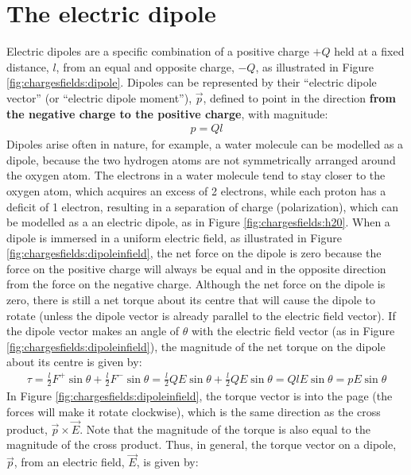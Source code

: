 \section{The electric dipole}
Electric dipoles are a specific combination of a positive charge $+Q$ held at a fixed distance, $l$, from an equal and opposite charge, $-Q$, as illustrated in Figure \ref{fig:chargesfields:dipole}. Dipoles can be represented by their ``electric dipole vector'' (or ``electric dipole moment''), $\vec p$, defined to point in the direction \textbf{from the negative charge to the positive charge}, with magnitude:
\begin{align*}
p=Ql
\end{align*}
Dipoles arise often in nature, for example, a water molecule can be modelled as a dipole, because the two hydrogen atoms are not symmetrically arranged around the oxygen atom. The electrons in a water molecule tend to stay closer to the oxygen atom, which acquires an excess of 2 electrons, while each proton has a deficit of 1 electron, resulting in a separation of charge (polarization), which can be modelled as a an electric dipole, as in Figure \ref{fig:chargesfields:h20}.
When a dipole is immersed in a uniform electric field, as illustrated in Figure \ref{fig:chargesfields:dipoleinfield}, the net force on the dipole is zero because the force on the positive charge will always be equal and in the opposite direction from the force on the negative charge. 
Although the net force on the dipole is zero, there is still a net torque about its centre that will cause the dipole to rotate (unless the dipole vector is already parallel to the electric field vector). If the dipole vector makes an angle of $\theta$ with the electric field vector (as in Figure \ref{fig:chargesfields:dipoleinfield}), the magnitude of the net torque on the dipole about its centre is given by:
\begin{align*}
\tau=\frac{l}{2}F^+\sin\theta+\frac{l}{2}F^-\sin\theta=\frac{l}{2}QE\sin\theta+\frac{l}{2}QE\sin\theta=QlE\sin\theta=pE\sin\theta
\end{align*}
In Figure \ref{fig:chargesfields:dipoleinfield}, the torque vector is into the page (the forces will make it rotate clockwise), which is the same direction as the cross product, $\vec p \times \vec E$. Note that the magnitude of the torque is also equal to the magnitude of the cross product. Thus, in general, the torque vector on a dipole, $\vec p$, from an electric field, $\vec E$, is given by:
